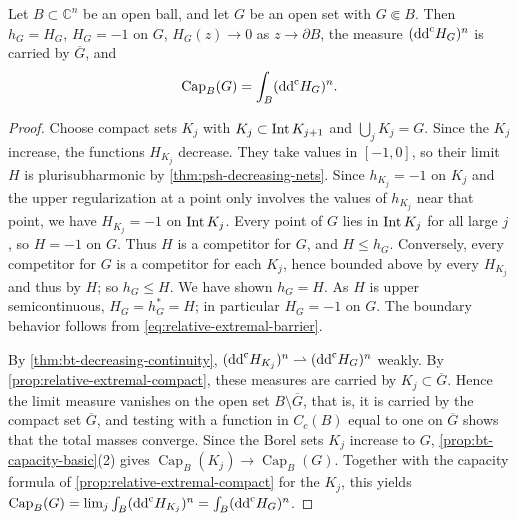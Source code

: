 
\begin{proposition}\label{prop:relative-extremal-open}
Let $B\subset\mathbb C^n$ be an open ball, and let $G$ be an open set with $G\Subset B$. Then $h_G=H_G$, $H_G=-1$ on $G$, $H_G(z)\to0$ as $z\to\partial B$, the measure $(\mathrm{dd}^{\mathrm{c}} H_G)^n$ is carried by $\overline G$, and
\[
 \operatorname{Cap}_B(G)=\int_B(\mathrm{dd}^{\mathrm{c}} H_G)^n.
\]
\end{proposition}
\begin{proof}
Choose compact sets $K_j$ with $K_j\subset\operatorname{Int} K_{j+1}$ and $\bigcup_jK_j=G$. Since the $K_j$ increase, the functions $H_{K_j}$ decrease. They take values in $[-1,0]$, so their limit $H$ is plurisubharmonic by \cref{thm:psh-decreasing-nets}. Since $h_{K_j}=-1$ on $K_j$ and the upper regularization at a point only involves the values of $h_{K_j}$ near that point, we have $H_{K_j}=-1$ on $\operatorname{Int} K_j$. Every point of $G$ lies in $\operatorname{Int} K_j$ for all large $j$, so $H=-1$ on $G$. Thus $H$ is a competitor for $G$, and $H\le h_G$. Conversely, every competitor for $G$ is a competitor for each $K_j$, hence bounded above by every $H_{K_j}$ and thus by $H$; so $h_G\le H$. We have shown $h_G=H$. As $H$ is upper semicontinuous, $H_G=h_G^*=H$; in particular $H_G=-1$ on $G$. The boundary behavior follows from \eqref{eq:relative-extremal-barrier}.

By \cref{thm:bt-decreasing-continuity}, $(\mathrm{dd}^{\mathrm{c}} H_{K_j})^n\rightharpoonup(\mathrm{dd}^{\mathrm{c}} H_G)^n$ weakly. By \cref{prop:relative-extremal-compact}, these measures are carried by $K_j\subset\overline G$. Hence the limit measure vanishes on the open set $B\setminus\overline G$, that is, it is carried by the compact set $\overline G$, and testing with a function in $C_c(B)$ equal to one on $\overline G$ shows that the total masses converge. Since the Borel sets $K_j$ increase to $G$, \cref{prop:bt-capacity-basic}(2) gives $\operatorname{Cap}_B(K_j)\to\operatorname{Cap}_B(G)$. Together with the capacity formula of \cref{prop:relative-extremal-compact} for the $K_j$, this yields $\operatorname{Cap}_B(G)=\lim_j\int_B(\mathrm{dd}^{\mathrm{c}} H_{K_j})^n=\int_B(\mathrm{dd}^{\mathrm{c}} H_G)^n$.
\end{proof}

